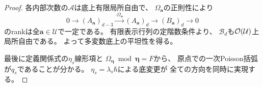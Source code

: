 \begin{proof}
各内部次数の$\mathcal A$は底上有限局所自由で、
$\Omega_{\boldsymbol a}$の正則性により
\begin{equation}
 0\longrightarrow(A_{\boldsymbol a})_{d-3}
 \xrightarrow{\cdot\Omega_{\boldsymbol a}}
 (A_{\boldsymbol a})_d
 \longrightarrow(B_{\boldsymbol a})_d
 \longrightarrow0
\end{equation}
のrankは全$\boldsymbol a\in\mathcal U$で一定である。
有限表示行列の定階数条件より、
$\mathcal B_d$も$\mathcal O(\mathcal U)$上局所自由である。
よって多変数底上の平坦性を得る。

最後に定義関係式の$\eta_s$線形項と
$\Omega_{\boldsymbol\eta}\bmod\boldsymbol\eta=F$から、
原点での一次Poisson括弧が$q_s$であることが分かる。
$\eta_s=\lambda_s\hbar$による底変更が
全ての方向を同時に実現する。
\end{proof}

